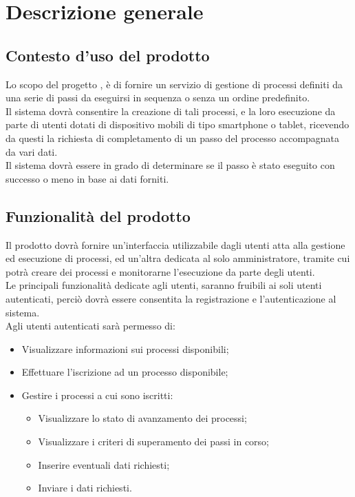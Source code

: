 \section{Descrizione generale}

\subsection{Contesto d'uso del prodotto}
Lo scopo del progetto \progetto{}, è di fornire un servizio di gestione di processi definiti da una serie di passi da eseguirsi in sequenza o senza un ordine predefinito.\\
Il sistema dovrà consentire la creazione di tali processi, e la loro esecuzione da parte di utenti dotati di dispositivo mobili di tipo smartphone o tablet, ricevendo da questi la richiesta di completamento di un passo del processo accompagnata da vari dati.\\
Il sistema dovrà essere in grado di determinare se il passo è stato eseguito con successo o meno in base ai dati forniti.

\subsection{Funzionalità del prodotto}
Il prodotto dovrà fornire un'interfaccia utilizzabile dagli utenti atta alla gestione ed esecuzione di processi, ed un'altra dedicata al solo amministratore, tramite cui potrà creare dei processi e monitorarne l'esecuzione da parte degli utenti.\\
Le principali funzionalità dedicate agli utenti, saranno fruibili ai soli utenti autenticati, perciò dovrà essere consentita la registrazione e l'autenticazione al sistema.\\
Agli utenti autenticati sarà permesso di:

\begin{itemize}
\item Visualizzare informazioni sui processi disponibili;
\item Effettuare l'iscrizione ad un processo disponibile;
\item Gestire i processi a cui sono iscritti:
\begin{itemize}
\item Visualizzare lo stato di avanzamento dei processi;
\item Visualizzare i criteri di superamento dei passi in corso;
\item Inserire eventuali dati richiesti;
\item Inviare i dati richiesti.
\end{itemize}
\end{itemize}

